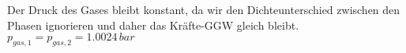 Der Druck des Gases bleibt konstant, da wir den Dichteunterschied zwischen den Phasen ignorieren und daher das Kräfte-GGW gleich bleibt.  
\( p_{gas,1} = p_{gas,2} = 1.0024 \, bar \)